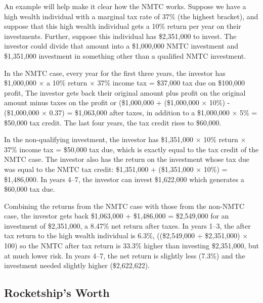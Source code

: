 An example will help make it clear how the NMTC works. Suppose we have a high wealth individual with a marginal tax rate of 37\% (the highest bracket), and suppose that this high wealth individual gets a 10\% return per year on their investments. Further, suppose this individual has \$2,351,000 to invest. The investor could divide that amount into a \$1,000,000 NMTC investment and \$1,351,000 investment in something other than a qualified NMTC investment.

In the NMTC case, every year for the first three years, the investor has \$1,000,000 $\times$ a 10\% return $\times$ 37\% income tax = \$37,000 tax due on \$100,000 profit, The investor gets back their original amount plus profit on the original amount minus taxes on the profit or (\$1,000,000 + (\$1,000,000 × 10\%) - (\$1,000,000 × 0.37) = \$1,063,000 after taxes, in addition to a \$1,000,000 × 5\% = \$50,000 tax credit. The last four years, the tax credit rises to \$60,000.
  
In the non-qualifying investment, the investor has \$1,351,000 $\times$ 10\% return $\times$ 37\% income tax = \$50,000 tax due, which is exactly equal to the tax credit of the NMTC case. The investor also has the return on the investment whose tax due was equal to the NMTC tax credit: \$1,351,000 + (\$1,351,000 $\times$ 10\%) = \$1,486,000. In years 4–7, the investor can invest \$1,622,000 which generates a \$60,000 tax due.

Combining the returns from the NMTC case with those from the non-NMTC case, the investor gets back \$1,063,000 + \$1,486,000 = \$2,549,000 for an investment of \$2,351,000, a 8.47\% net return after taxes. In years 1–3, the after tax return to the high wealth individual is 6.3\%, ((\$2,549,000 $÷$ \$2,351,000) $×$ 100) so the NMTC after tax return is 33.3\% higher than investing \$2,351,000, but at much lower risk. In years 4–7, the net return is slightly less (7.3\%) and the investment needed slightly higher (\$2,622,622).

\subsection{Rocketship's Worth}%
\label{sec:rocketship-worth}\indent%

